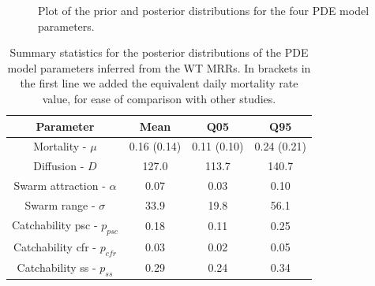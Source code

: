 \documentclass[]{bmcart}
\begin{document}
\begin{figure}[t]
\caption[Plot of the prior and posterior distributions for the four PDE model parameters.]{Plot of the prior and posterior distributions for the four PDE model parameters.}\label{fig:prior_posterior}
\end{figure}

\begin{table}[h]
\centering
\begingroup\small
\begin{tabular}{|c|ccc|}
\hline
Parameter & Mean & Q05 & Q95 \\\hline
Mortality - $\mu$ & 0.16 (0.14) & 0.11 (0.10) & 0.24 (0.21)\\
Diffusion - $D$ & 127.0 & 113.7 & 140.7\\
Swarm attraction - $\alpha$ & 0.07 & 0.03 & 0.10\\
Swarm range - $\sigma$ & 33.9 & 19.8 & 56.1\\
Catchability psc - $p_{psc}$ & 0.18 & 0.11 & 0.25\\
Catchability cfr - $p_{cfr}$ & 0.03 & 0.02 & 0.05\\
Catchability ss - $p_{ss}$ & 0.29 & 0.24 & 0.34\\
\hline
\end{tabular}
\endgroup
\caption{\label{tble:sumStatPPpost} Summary statistics for the posterior distributions of the PDE model parameters inferred from the WT MRRs. In brackets in the first line we added the equivalent daily mortality rate value, for ease of comparison with other studies.}
\end{table}
\end{document}
